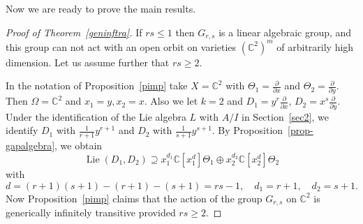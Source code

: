 \documentclass[a4paper,draft,reqno,12pt]{amsart}
\theoremstyle{definition}
\theoremstyle{remark}
\DeclareMathOperator{\lie}{Lie}
\def\CC{{\mathbb C}}
\renewcommand{\ge}{\geqslant}
\renewcommand{\le}{\leqslant}
\begin{document}
\smallskip

Now we are ready to prove the main results. 

\begin{proof}[Proof of Theorem~\ref{geninftra}]
If $rs\le 1$ then $G_{r,s}$ is a linear algebraic group, and this group can not act with an open orbit on varieties $(\CC^2)^m$ of arbitrarily high dimension. Let us assume further that $rs\ge 2$. 

In the notation of Proposition~\ref{pimp} take $X=\CC^2$ with $\Theta_1=\frac{\partial}{\partial x}$ and $\Theta_2=\frac{\partial}{\partial y}$. Then $\Omega=\CC^2$ and $x_1=y, x_2=x$. 
Also we let $k=2$ and $D_1=y^r\frac{\partial}{\partial x}$, $D_2=x^s\frac{\partial}{\partial y}$. Under the identification of the Lie algebra $L$ with $A/I$ in Section~\ref{sec2},
we identify $D_1$ with $\frac{1}{r+1}y^{r+1}$ and $D_2$ with $\frac{1}{s+1}y^{s+1}$.  By Proposition~\ref{prop-gapalgebra}, we obtain
$$
\lie(D_1, D_2)\supseteq x_1^{d_1}\CC[x_1^d]\Theta_1\oplus x_2^{d_2}\CC[x_2^d]\Theta_2
$$
with 
$$
d=(r+1)(s+1)-(r+1)-(s+1)=rs-1, \quad d_1=r+1, \quad d_2=s+1.
$$  
Now Proposition~\ref{pimp} claims that the action of the group $G_{r,s}$ on $\CC^2$ is generically infinitely transitive provided $rs\ge 2$. 
\end{proof}

\smallskip
\end{document}
